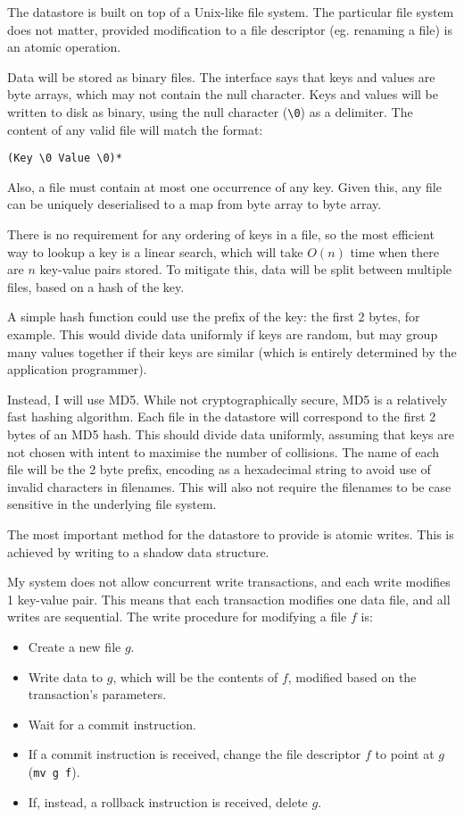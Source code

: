\documentclass[12pt,a4paper]{article}
\begin{document}
The datastore is built on top of a Unix-like file system. The particular file system does not matter, provided modification to a file descriptor (eg. renaming a file) is an atomic operation.

Data will be stored as binary files. The interface says that keys and values are byte arrays, which may not contain the null character. Keys and values will be written to disk as binary, using the null character (\verb|\0|) as a delimiter. The content of any valid file will match the format:

\verb|(Key \0 Value \0)*|

Also, a file must contain at most one occurrence of any key. Given this, any file can be uniquely deserialised to a map from byte array to byte array.

There is no requirement for any ordering of keys in a file, so the most efficient way to lookup a key is a linear search, which will take $O(n)$ time when there are $n$ key-value pairs stored. To mitigate this, data will be split between multiple files, based on a hash of the key.

A simple hash function could use the prefix of the key: the first 2 bytes, for example. This would divide data uniformly if keys are random, but may group many values together if their keys are similar (which is entirely determined by the application programmer).

Instead, I will use MD5. While not cryptographically secure, MD5 is a relatively fast hashing algorithm. Each file in the datastore will correspond to the first 2 bytes of an MD5 hash. This should divide data uniformly, assuming that keys are not chosen with intent to maximise the number of collisions. The name of each file will be the 2 byte prefix, encoding as a hexadecimal string to avoid use of invalid characters in filenames. This will also not require the filenames to be case sensitive in the underlying file system.

The most important method for the datastore to provide is atomic writes. This is achieved by writing to a shadow data structure.

My system does not allow concurrent write transactions, and each write modifies 1 key-value pair. This means that each transaction modifies one data file, and all writes are sequential. The write procedure for modifying a file $f$ is:

\begin{itemize}
  \item
  Create a new file $g$.

  \item
  Write data to $g$, which will be the contents of $f$, modified based on the transaction's parameters.

  \item
  Wait for a commit instruction.

  \item
  If a commit instruction is received, change the file descriptor $f$ to point at $g$ (\verb|mv g f|).

  \item
  If, instead, a rollback instruction is received, delete $g$.

\end{itemize}
\end{document}
